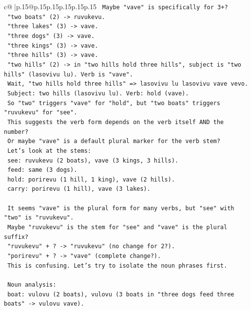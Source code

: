 \documentclass{article}
\begin{document}
{\begin{supertabular}{c@{$\;$}|p{.15\linewidth}@{}p{.15\linewidth}p{.15\linewidth}p{.15\linewidth}p{.15\linewidth}p{.15\linewidth}}
{{{\texttt{   Maybe "vave" is specifically for 3+?} \\
\texttt{   "two boats" (2) {-}> ruvukevu.} \\
\texttt{   "three lakes" (3) {-}> vave.} \\
\texttt{   "three dogs" (3) {-}> vave.} \\
\texttt{   "three kings" (3) {-}> vave.} \\
\texttt{   "three hills" (3) {-}> vave.} \\
\texttt{   "two hills" (2) {-}> in "two hills hold three hills", subject is "two hills" (lasovivu lu). Verb is "vave".} \\
\texttt{   Wait, "two hills hold three hills" => lasovivu lu lasovivu vave vevo.} \\
\texttt{   Subject: two hills (lasovivu lu). Verb: hold (vave).} \\
\texttt{   So "two" triggers "vave" for "hold", but "two boats" triggers "ruvukevu" for "see".} \\
\texttt{   This suggests the verb form depends on the verb itself AND the number?} \\
\texttt{   Or maybe "vave" is a default plural marker for the verb stem?} \\
\texttt{   Let's look at the stems:} \\
\texttt{   see: ruvukevu (2 boats), vave (3 kings, 3 hills).} \\
\texttt{   feed: same (3 dogs).} \\
\texttt{   hold: porirevu (1 hill, 1 king), vave (2 hills).} \\
\texttt{   carry: porirevu (1 hill), vave (3 lakes).} \\
\\ 
\texttt{   It seems "vave" is the plural form for many verbs, but "see" with "two" is "ruvukevu".} \\
\texttt{   Maybe "ruvukevu" is the stem for "see" and "vave" is the plural suffix?} \\
\texttt{   "ruvukevu" + ? {-}> "ruvukevu" (no change for 2?).} \\
\texttt{   "porirevu" + ? {-}> "vave" (complete change?).} \\
\texttt{   This is confusing. Let's try to isolate the noun phrases first.} \\
\\ 
\texttt{   Noun analysis:} \\
\texttt{   boat: vulovu (2 boats), vulovu (3 boats in "three dogs feed three boats" {-}> vulovu vave).} \\
}}}
\end{supertabular}}
\end{document}
